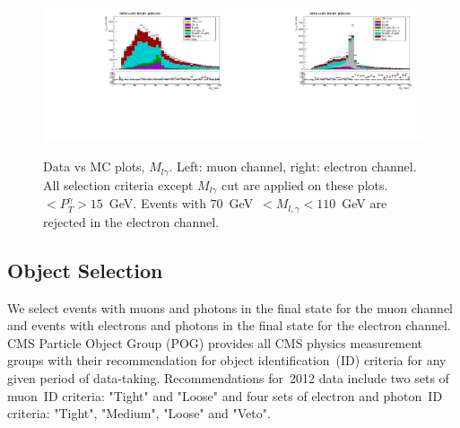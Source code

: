 \begin{figure}[htb]
  \begin{center}
   \includegraphics[width=0.5\textwidth]{../figs/figs_v11/MUON_WGamma/PrepareYields/c_TotalDATAvsMC_EtaCommon__Mpholep1_pt15to500_.pdf}\includegraphics[width=0.5\textwidth]{../figs/figs_v11/ELECTRON_WGamma/PrepareYields/c_TotalDATAvsMC_EtaCommon__Mpholep1PRELIMINARY_FOR_E_TO_GAMMA_WITH_PSV_CUT_pt15to500_.pdf}
  \caption{Data vs MC plots, $M_{l\gamma}$. Left: muon channel, right: electron channel. All selection criteria except $M_{l\gamma}$ cut are applied on these plots. $<P_T^{\gamma}>15$~GeV. Events with $70$~GeV~$<M_{l,\gamma}<110$~GeV are rejected in the electron channel.}
  \label{fig:DATAvsMC_Mpholep1}
  \end{center}
\end{figure}

\subsection{Object Selection}
\label{sec:AN_ObjectSelection}

We select events with muons and photons in the final state for the muon channel and events with electrons and photons in the final state for the electron channel. CMS Particle Object Group (POG) provides all CMS physics measurement groups with their recommendation for object identification~(ID) criteria for any given period of data-taking. Recommendations for~2012 data include two sets of muon~ID criteria: "Tight" and "Loose" and four sets of electron and photon~ID criteria: "Tight", "Medium", "Loose" and "Veto".

